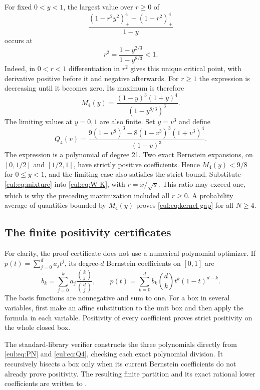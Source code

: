 For fixed $0<y<1$, the largest value over $r\ge0$ of
\[
 \frac{(1-r^2y^2)_+^4-(1-r^2)_+^4}{1-y}
\]
occurs at
\[
 r^2=\frac{1-y^{2/3}}{1-y^{8/3}}<1.
\]
Indeed, in $0<r<1$ differentiation in $r^2$ gives this unique critical
point, with derivative positive before it and negative afterwards.
For $r\ge1$ the expression is decreasing until it becomes zero.
Its maximum is therefore
\begin{equation}\label{eul:eq:M4}
 M_4(y)=\frac{(1-y)^3(1+y)^4}{(1-y^{8/3})^3}.
\end{equation}
The limiting values at $y=0,1$ are also finite. Set $y=v^3$ and
define
\begin{equation}\label{eul:eq:Q4}
 Q_4(v)=\frac{9(1-v^8)^3-8(1-v^3)^3(1+v^3)^4}{(1-v)^3}.
\end{equation}
The expression is a polynomial of degree 21. Two exact Bernstein
expansions, on $[0,1/2]$ and $[1/2,1]$, have strictly positive
coefficients. Hence $M_4(y)<9/8$ for $0\le y<1$, and the limiting
case also satisfies the strict bound. Substitute \eqref{eul:eq:mixture}
into \eqref{eul:eq:W-K}, with $r=x/\sqrt{s}$. This ratio may exceed
one, which is why the preceding maximization included all $r\ge0$.
A probability average of quantities bounded by $M_4(y)$ proves
\eqref{eul:eq:kernel-gap} for all $N\ge4$.

\subsection{The finite positivity certificates}

For clarity, the proof certificate does not use a numerical polynomial
optimizer. If $p(t)=\sum_{j=0}^{d}a_jt^j$, its degree-$d$ Bernstein
coefficients on $[0,1]$ are
\begin{equation}\label{eul:eq:bernstein}
 b_k=\sum_{j=0}^{k}a_j\frac{\binom{k}{j}}{\binom{d}{j}},\qquad
 p(t)=\sum_{k=0}^{d}b_k\binom{d}{k}t^k(1-t)^{d-k}.
\end{equation}
The basis functions are nonnegative and sum to one. For a box in
several variables, first make an affine substitution to the unit box
and then apply the formula in each variable. Positivity of every
coefficient proves strict positivity on the whole closed box.

The standard-library verifier 
constructs the three polynomials directly from
\eqref{eul:eq:PN} and \eqref{eul:eq:Q4}, checking each exact polynomial
division. It recursively bisects a box only when its current
Bernstein coefficients do not already prove positivity. The resulting
finite partition and its exact rational lower coefficients are written
to .

